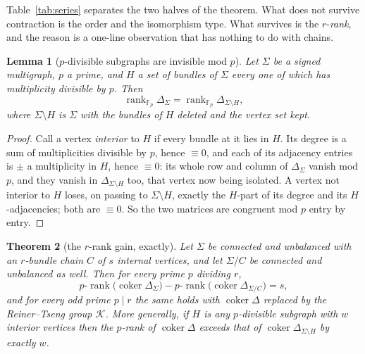 \documentclass[11pt]{article}
\theoremstyle{plain}
\newtheorem{theorem}{Theorem}
\newtheorem{lemma}[theorem]{Lemma}
\theoremstyle{definition}
\theoremstyle{remark}
\newcommand{\K}{\mathcal{K}}
\newcommand{\coker}{\operatorname{coker}}
\newcommand{\rank}{\operatorname{rank}}
\newcommand{\Sig}{\Sigma}
\begin{document}
Table~\ref{tab:series} separates the two halves of the theorem. What does not survive
contraction is the order and the isomorphism type. What survives is the $r$-\emph{rank}, and
the reason is a one-line observation that has nothing to do with chains.

\begin{lemma}[$p$-divisible subgraphs are invisible mod $p$]\label{lem:pdiv}
Let $\Sig$ be a signed multigraph, $p$ a prime, and $H$ a set of bundles of $\Sig$ every one
of which has multiplicity divisible by $p$. Then
\[
  \rank_{\mathbb F_p}\Delta_\Sig=\rank_{\mathbb F_p}\Delta_{\Sig\setminus H},
\]
where $\Sig\setminus H$ is $\Sig$ with the bundles of $H$ deleted and the vertex set kept.
\end{lemma}

\begin{proof}
Call a vertex \emph{interior} to $H$ if every bundle at it lies in $H$. Its degree is a sum
of multiplicities divisible by $p$, hence $\equiv0$, and each of its adjacency entries is
$\pm$ a multiplicity in $H$, hence $\equiv0$: its whole row and column of $\Delta_\Sig$
vanish mod $p$, and they vanish in $\Delta_{\Sig\setminus H}$ too, that vertex now being
isolated. A vertex not interior to $H$ loses, on passing to $\Sig\setminus H$, exactly the
$H$-part of its degree and its $H$-adjacencies; both are $\equiv0$. So the two matrices are
congruent mod $p$ entry by entry.
\end{proof}

\begin{theorem}[the $r$-rank gain, exactly]\label{thm:prank}
Let $\Sig$ be connected and unbalanced with an $r$-bundle chain $C$ of $s$ internal vertices,
and let $\Sig/C$ be connected and unbalanced as well. Then for every prime $p$ dividing $r$,
\[
  p\text{-}\rank\bigl(\coker\Delta_\Sig\bigr)-p\text{-}\rank\bigl(\coker\Delta_{\Sig/C}\bigr)=s ,
\]
and for every \emph{odd} prime $p\mid r$ the same holds with $\coker\Delta$ replaced by the
Reiner--Tseng group $\K$. More generally, if $H$ is any $p$-divisible subgraph with $w$
interior vertices then the $p$-rank of $\coker\Delta$ exceeds that of
$\coker\Delta_{\Sig\setminus H}$ by exactly $w$.
\end{theorem}
\end{document}
